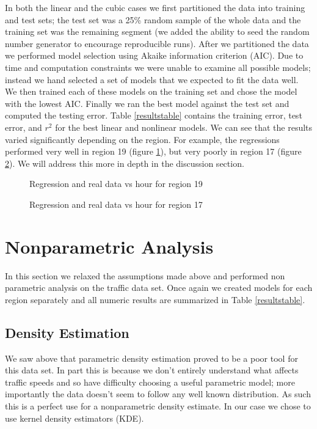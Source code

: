 \documentclass[12pt]{article}
\begin{document}
In both the linear and the cubic cases we first partitioned the data into training and test sets; the test set was a 25\% random sample of the whole data and the training set was the remaining segment (we added the ability to seed the random number generator to encourage reproducible runs). After we partitioned the data we performed model selection using Akaike information criterion (AIC). Due to time and computation constraints we were unable to examine all possible models; instead we hand selected a set of models that we expected to fit the data well. We then trained each of these models on the training set and chose the model with the lowest AIC. Finally we ran the best model against the test set and computed the testing error. Table \ref{resultstable} contains the training error, test error, and $r^2$ for the best linear and nonlinear models. We can see that the results varied significantly depending on the region. For example, the regressions performed very well in region 19 (figure \ref{region19parametricregression}), but very poorly in region 17 (figure \ref{region17parametricregression}). We will address this more in depth in the discussion section.
\begin{figure}[!ht]
\centering
{} 
\caption{Regression and real data vs hour for region 19}
\label{region19parametricregression}
\end{figure}

\begin{figure}[!ht]
\centering
{} 
\caption{Regression and real data vs hour for region 17}
\label{region17parametricregression}
\end{figure}

\section{Nonparametric Analysis}
In this section we relaxed the assumptions made above and performed non parametric analysis on the traffic data set. Once again we created models for each region separately and all numeric results are summarized in Table \ref{resultstable}.
\subsection{Density Estimation}
We saw above that parametric density estimation proved to be a poor tool for this data set. In part this is because we don't entirely understand what affects traffic speeds and so have difficulty choosing a useful parametric model; more importantly the data doesn't seem to follow any well known distribution. As such this is a perfect use for a nonparametric density estimate. In our case we chose to use kernel density estimators (KDE). 
\end{document}
